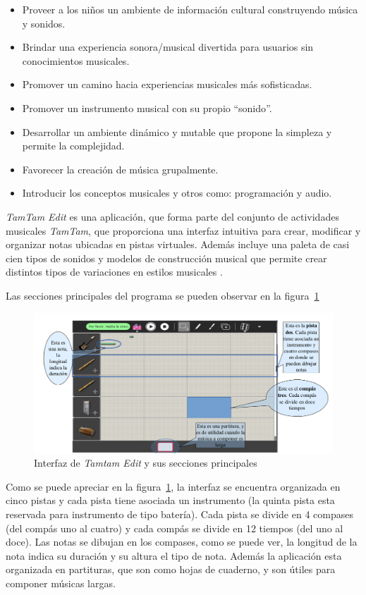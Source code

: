 \begin{itemize}
    \item Proveer a los niños un ambiente de información cultural construyendo música y sonidos.
    \item Brindar una experiencia sonora/musical divertida para usuarios sin conocimientos musicales.
    \item Promover un camino hacia experiencias musicales más sofisticadas.
    \item Promover un instrumento musical con su propio ``sonido''.
    \item Desarrollar un ambiente dinámico y mutable que propone la simpleza y permite la complejidad.
    \item Favorecer la creación de música grupalmente.
    \item Introducir los conceptos musicales y otros como: programación y audio.
\end{itemize}

\emph{TamTam Edit} es una aplicaci\'on, que forma parte del conjunto de actividades musicales \emph{TamTam}, que proporciona
una interfaz intuitiva para crear, modificar y organizar notas ubicadas en pistas virtuales. Adem\'as incluye una paleta de
casi cien tipos de sonidos y modelos de construcci\'on musical que permite crear distintos tipos de variaciones en estilos
musicales \cite{TamTamWiki}.


Las secciones principales del programa se pueden observar en la figura~\ref{figure:ui-tamtam} 

\begin{figure}[H]
\centering
\includegraphics[width=\textwidth]{./graphics/ui-tamtam-edit.png}
\caption{Interfaz de \emph{Tamtam Edit} y sus secciones principales}
\label{figure:ui-tamtam}
\end{figure}

Como se puede apreciar en la figura~\ref{figure:ui-tamtam}, la interfaz se encuentra organizada en cinco pistas y cada pista tiene asociada un 
instrumento (la quinta pista esta reservada para instrumento de tipo batería). Cada pista se divide en 4 
compases (del compás uno al cuatro) y cada compás se divide en 12 tiempos (del uno al doce). 
Las notas se dibujan en los compases, como se puede ver, la longitud de la nota indica su duración y su 
altura el tipo de nota. Además la aplicación esta organizada en partituras, que son como hojas de 
cuaderno, y son útiles para componer músicas largas.

